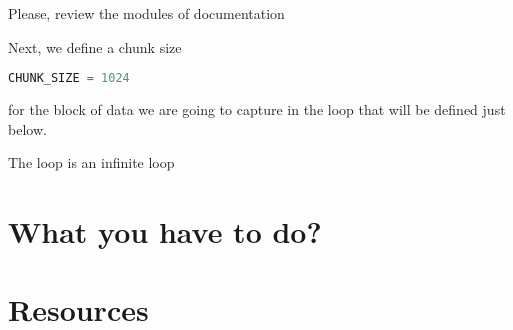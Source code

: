 Please, review the modules of documentation 

Next, we define a chunk size
\begin{lstlisting}[language=Python]
CHUNK_SIZE = 1024
\end{lstlisting}
for the block of data we are going to capture in the loop that will
be defined just below.

The loop is an infinite loop

\section{What you have to do?}

\section{Resources}

